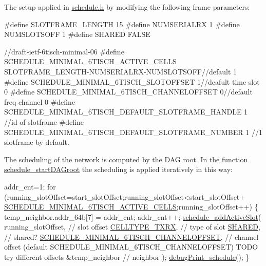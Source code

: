 The setup applied in \hyperlink{schedule_8h}{schedule.\+h} by modifying the following frame parameters\+: 
\begin{DoxyCodeInclude}
\textcolor{preprocessor}{#define SLOTFRAME\_LENGTH    15}
\textcolor{preprocessor}{#define NUMSERIALRX          1 }
\textcolor{preprocessor}{#define NUMSLOTSOFF          1 }
\textcolor{preprocessor}{}
\textcolor{preprocessor}{#define SHARED FALSE}

\textcolor{comment}{//draft-ietf-6tisch-minimal-06 }
\textcolor{comment}{}\textcolor{preprocessor}{#define SCHEDULE\_MINIMAL\_6TISCH\_ACTIVE\_CELLS  SLOTFRAME\_LENGTH-NUMSERIALRX-NUMSLOTSOFF//default 1}
\textcolor{preprocessor}{#define SCHEDULE\_MINIMAL\_6TISCH\_SLOTOFFSET                        1//deafult time slot 0}
\textcolor{preprocessor}{#define SCHEDULE\_MINIMAL\_6TISCH\_CHANNELOFFSET                     0//default freq channel 0}
\textcolor{preprocessor}{#define SCHEDULE\_MINIMAL\_6TISCH\_DEFAULT\_SLOTFRAME\_HANDLE          1 //id of slotframe}
\textcolor{preprocessor}{#define SCHEDULE\_MINIMAL\_6TISCH\_DEFAULT\_SLOTFRAME\_NUMBER          1 //1 slotframe by default.}

\end{DoxyCodeInclude}
 The scheduling of the network is computed by the D\+AG root. In the function \hyperlink{group___schedule_gade694f312044f8bff151d58c7976d067}{schedule\+\_\+start\+D\+A\+Groot} the scheduling is applied iteratively in this way\+:


\begin{DoxyCodeInclude}
    addr\_cnt=1;
    \textcolor{keywordflow}{for} (running\_slotOffset=start\_slotOffset;running\_slotOffset<start\_slotOffset+
      \hyperlink{group___schedule_ga299d7e29eb70888b68ace83fd3f1a8df}{SCHEDULE\_MINIMAL\_6TISCH\_ACTIVE\_CELLS};running\_slotOffset++) \{
        temp\_neighbor.addr\_64b[7]   = addr\_cnt;
        addr\_cnt++;
      \hyperlink{group___schedule_ga00825b0f7040c67065d65aadde478241}{schedule\_addActiveSlot}(
         running\_slotOffset,                 \textcolor{comment}{// slot offset}
         \hyperlink{group___schedule_ggad8490d4fdf8cef27f7e5fa6a37046a3da703f29e4d2b16980f09eceaeb7a35281}{CELLTYPE\_TXRX},                      \textcolor{comment}{// type of slot}
         \hyperlink{group___schedule_ga884c794595c4aa480df9022648c29564}{SHARED},                               \textcolor{comment}{// shared?}
         \hyperlink{group___schedule_ga485a603a3e03059901c4fc5fc968a1e9}{SCHEDULE\_MINIMAL\_6TISCH\_CHANNELOFFSET},    \textcolor{comment}{// channel offset
       (default SCHEDULE\_MINIMAL\_6TISCH\_CHANNELOFFSET) TODO try different offsets}
         &temp\_neighbor                      \textcolor{comment}{// neighbor}
      );
      \hyperlink{group___schedule_gafbaaa0f57ce9c382c0fc00225a7b2078}{debugPrint\_schedule}();
   \}
\end{DoxyCodeInclude}
